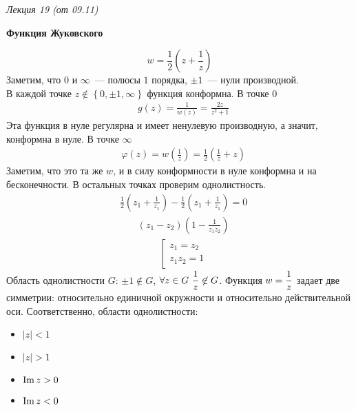 \begin{flushright}
    \textit{Лекция 19 (от 09.11)}
\end{flushright}
\begin{center}
    \textbf{Функция Жуковского}
\end{center}
\begin{equation}\label{(24.1)}
    w = \frac{1}{2}\left( z+\frac{1}{z} \right)
\end{equation}
Заметим, что $0$ и $\infty$~--- полюсы $1$ порядка, $\pm 1$~--- нули
производной.
\\
В каждой точке $z \not \in \left\{0, \pm 1,\infty \right\}$ функция конформна. В
точке $0$
\begin{align*}
  & g(z) = \frac{1}{w(z)} = \frac{2z}{z^2+1}
\end{align*}
Эта функция в нуле регулярна и имеет ненулевую производную, а значит, конформна
в нуле. В точке $\infty$
\begin{align*}
  & \varphi(z) = w\left( \frac{1}{z} \right) = \frac{1}{2}\left( \frac{1}{z} + z \right)
\end{align*}
Заметим, что это та же $w$, и в силу конформности в нуле конформна и на
бесконечности. В остальных точках проверим однолистность.
\begin{align*}
  & \frac{1}{2}\left( z_1 + \frac{1}{z_1} \right) - \frac{1}{2}\left( z_1 + \frac{1}{z_1} \right) = 0
\end{align*}
\begin{align*}
  & (z_1-z_2) \left( 1-\frac{1}{z_1z_2} \right)
\end{align*}
\begin{align*}
  & \left[ \begin{matrix}
          z_1=z_2 \\
          z_1z_2 = 1
      \end{matrix} \right.
\end{align*}
Область однолистности $G$: $\pm 1 \not \in G$, $\forall z \in G \ \displaystyle
\frac{1}{z} \not \in G$.
\Example
Функция $w = \displaystyle \frac{1}{z}$ задает две симметрии: относительно единичной
окружности и относительно действительной оси. Соответственно, области
однолистности:
\begin{itemize}
    \item $\left| z \right| < 1$
    \item $\left| z \right| > 1$
    \item $\mathrm{Im}\, z > 0$
    \item $\mathrm{Im}\, z < 0$
\end{itemize}
